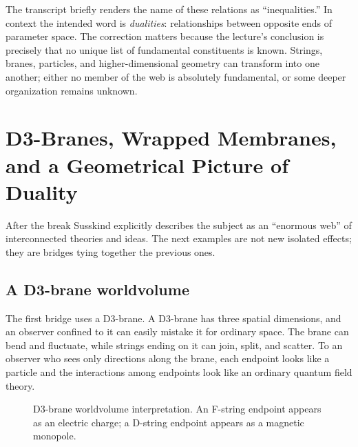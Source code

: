 The transcript briefly renders the name of these relations as ``inequalities.'' In context the intended word is \emph{dualities}: relationships between opposite ends of parameter space. The correction matters because the lecture's conclusion is precisely that no unique list of fundamental constituents is known. Strings, branes, particles, and higher-dimensional geometry can transform into one another; either no member of the web is absolutely fundamental, or some deeper organization remains unknown.

\section{D3-Branes, Wrapped Membranes, and a Geometrical Picture of Duality}

After the break Susskind explicitly describes the subject as an ``enormous web'' of interconnected theories and ideas. The next examples are not new isolated effects; they are bridges tying together the previous ones.

\subsection{A D3-brane worldvolume}

The first bridge uses a D3-brane. A D3-brane has three spatial dimensions, and an observer confined to it can easily mistake it for ordinary space. The brane can bend and fluctuate, while strings ending on it can join, split, and scatter. To an observer who sees only directions along the brane, each endpoint looks like a particle and the interactions among endpoints look like an ordinary quantum field theory.

\begin{figure}[htbp]
\centering
{}%
\caption{D3-brane worldvolume interpretation. An F-string endpoint appears as an electric charge; a D-string endpoint appears as a magnetic monopole.}
\end{figure}

